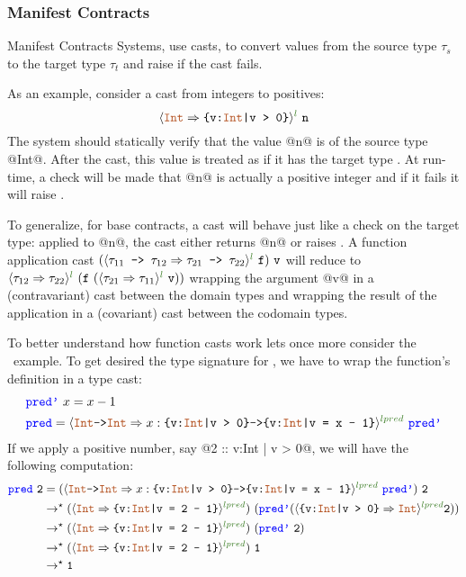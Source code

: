 \subsubsection{Manifest Contracts}

Manifest Contracts Systems\cite{Greenberg12}, use casts,
to convert values from the source type $\tau_s$ 
to the target type $\tau_t$ and raise 
if the cast fails.

As an example, consider a cast from integers to positives:
$$
\ecast{\tyint}{\ttpos}{l} \ \texttt{n}
$$
The system should statically verify that the value @n@ is 
of the source type @Int@.
After the cast, this value is treated as
if it has the target type \ttpos.
At run-time, a check will be made that @n@ 
is actually a positive integer and if it fails it will raise .

To generalize, for base contracts, a cast will behave just like a check on the target type: 
applied to @n@, the cast either returns @n@ or raises  . 
%
A function application cast 
$(\ecast{\tau_{11} \texttt{ -> } \tau_{12}}{\tau_{21} \texttt{ -> } \tau_{22}}{l} \ \texttt{f} ) \ \texttt{v}$
will reduce to 
$\ecast{\tau_{12}}{\tau_{22}}{l}\ (
	\texttt{f} \ 
	(
		\ecast{\tau_{21}}{\tau_{11}}{l} 
		\ \texttt{v}
	)
)$
wrapping the argument @v@ in a (contravariant) cast between the domain types
and wrapping the result of the application in a (covariant) cast between the
codomain types.

To better understand how function casts work lets once more consider 
the \predname\ example.
%
To get desired the type signature for \predname, 
we have to wrap the function's definition 
in a type cast:
\begin{align*}
& \prednamep\ x= x - 1 \\
& \predname  = \ecast{\tyint \texttt{->} \tyint}{x:\ttpos \texttt{->} \ttpred{x}}{lpred} \ \prednamep
\end{align*}
If we apply a positive number, say @2 :: {v:Int | v > 0}@, we will have the following computation:
%
\begin{align*}
\predname\ \texttt{2} &=
(\ecast{\tyint \texttt{->} \tyint}{x:\ttpos \texttt{->} \ttpred{x}}{lpred} \ \prednamep)\ \texttt{2} \\
&\rightarrow^\star (\ecast{\tyint}{\ttpred{2}}{lpred}) \ (\prednamep(\ecast{\ttpos}{\tyint}{lpred}\texttt{2})) \\ 
&\rightarrow^\star (\ecast{\tyint}{\ttpred{2}}{lpred}) \ (\prednamep\ \texttt{2}) \\ 
&\rightarrow^\star (\ecast{\tyint}{\ttpred{2}}{lpred}) \ \texttt{1} \\ 
&\rightarrow^\star \texttt{1} \\ 
\end{align*}

